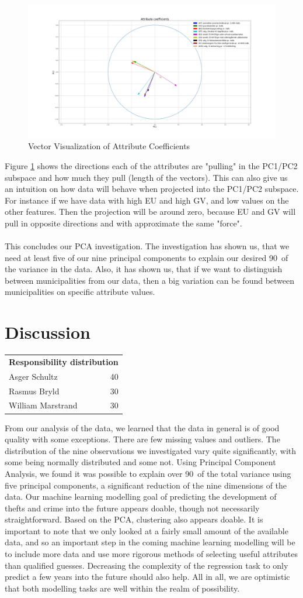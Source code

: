 \documentclass[11pt,fleqn]{article}
\newcommand{\respdist}[3]{
	\vspace*{-.5cm}
	\begin{table}[H]
	\small
		\begin{tabular}{l r}
			\multicolumn{2}{l}{\textbf{Responsibility distribution}}	\\
			Asger Schultz&	#1\pro\\
			Rasmus Bryld&	#2\pro\\
			William Marstrand&#3\pro
		\end{tabular}
	\end{table}
	\vspace*{-.3cm}
}
\numberwithin{footnote}{section}
\numberwithin{figure}{section}
\numberwithin{table}{section}
\begin{document}
\begin{figure}[H]
	\centering
	\includegraphics[width=\textwidth]{attribute_coefficients_arrows}
	\caption{Vector Visualization of Attribute Coefficients}
	\label{att_vec}
\end{figure}\noindent
Figure \ref{att_vec} shows the directions each of the attributes are "pulling" in the PC1/PC2 subspace and how much they pull (length of the vectors).
This can also give us an intuition on how data will behave when projected into the PC1/PC2 subspace.
For instance if we have data with high EU and high GV, and low values on the other features.
Then the projection will be around zero, because EU and GV will pull in opposite directions and with approximate the same "force".
\\\\
This concludes our PCA investigation.
The investigation has shown us, that we need at least five of our nine principal components to explain our desired 90\pro\ of the variance in the data.
Also, it has shown us, that if we want to distinguish between municipalities from our data, then a big variation can be found between municipalities on specific attribute values.
\clearpage
\section{Discussion}
\respdist{40}{30}{30}
From our analysis of the data, we learned that the data in general is of good quality with some exceptions.
There are few missing values and outliers.
The distribution of the nine observations we investigated vary quite significantly, with some being normally distributed and some not.
Using Principal Component Analysis, we found it was possible to explain over 90\pro\ of the total variance using five principal components, a significant reduction of the nine dimensions of the data.
Our machine learning modelling goal of predicting the development of thefts and crime into the future appears doable, though not necessarily straightforward.
Based on the PCA, clustering also appears doable.
It is important to note that we only looked at a fairly small amount of the available data, and so an important step in the coming machine learning modelling will be to include more data and use more rigorous methods of selecting useful attributes than qualified guesses. Decreasing the complexity of the regression task to only predict a few years into the future should also help.
All in all, we are optimistic that both modelling tasks are well within the realm of possibility.
\end{document}
